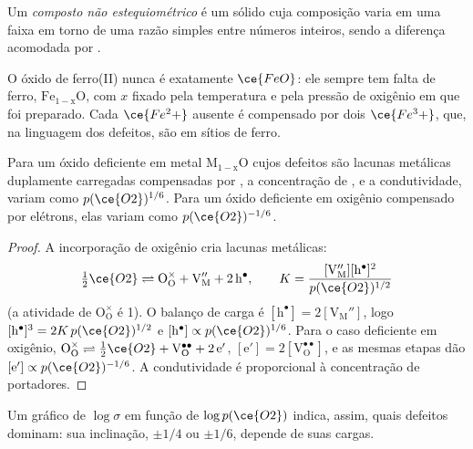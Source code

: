 \begin{definition}\label{def:b3:solid-state:non-stoichiometric}
Um \emph{composto não estequiométrico} é um
sólido cuja composição varia em uma faixa em torno de uma razão simples entre números
inteiros, sendo a diferença acomodada por .
\end{definition}

O óxido de ferro(II) nunca é exatamente $\ce{FeO}$: ele sempre tem falta de ferro,
$\mathrm{Fe_{1-x}O}$, com $x$ fixado pela temperatura e pela pressão de oxigênio em que foi preparado. Cada $\ce{Fe^2+}$ ausente é compensado por dois
$\ce{Fe^3+}$, que, na linguagem dos defeitos, são  em sítios de ferro.

\begin{proposition}\label{prop:b3:solid-state:brouwer}
Para um óxido deficiente em metal $\mathrm{M_{1-x}O}$ cujos defeitos são lacunas metálicas duplamente carregadas
compensadas por , a concentração de , e a condutividade, variam como
$p(\ce{O2})^{1/6}$. Para um óxido deficiente em oxigênio compensado por elétrons, elas variam como
$p(\ce{O2})^{-1/6}$.
\end{proposition}

\begin{proof}
A incorporação de oxigênio cria lacunas metálicas:
\[
  \tfrac12\ce{O2} \rightleftharpoons \mathrm{O_O^{\times} + V_M'' + 2\,h^{\bullet}}, \qquad K = \frac{[\mathrm{V_M''}][\mathrm h^\bullet]^2}{p(\ce{O2})^{1/2}}
\]
(a atividade de $\mathrm{O_O^{\times}}$ é 1). O
balanço de carga é $[\mathrm h^\bullet] = 2[\mathrm{V_M''}]$, logo $[\mathrm h^\bullet]^3 = 2K\,p(\ce{O2})^{1/2}$ e $[\mathrm h^\bullet] \propto p(\ce{O2})^{1/6}$. Para o
caso deficiente em oxigênio, $\mathrm{O_O^{\times}} \rightleftharpoons \tfrac12\ce{O2} + \mathrm{V_O^{\bullet\bullet} + 2\,e'}$, $[\mathrm e'] = 2[\mathrm{V_O^{\bullet\bullet}}]$, e as mesmas etapas dão $[\mathrm e'] \propto p(\ce{O2})^{-1/6}$.
A condutividade é proporcional à concentração de portadores.
\end{proof}

Um gráfico de $\log\sigma$ em função de $\log p(\ce{O2})$ indica, assim, quais defeitos dominam: sua inclinação,
$\pm 1/4$ ou $\pm 1/6$, depende de suas cargas.


